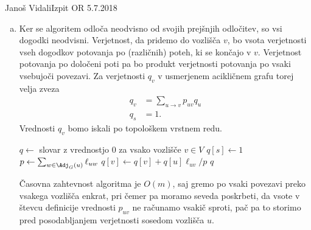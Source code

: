 \begin{naloga}{Janoš Vidali}{Izpit OR 5.7.2018}
\begin{odgovor}
\begin{enumerate}[(a)]
\item Ker se algoritem odloča neodvisno od svojih prejšnjih odločitev,
so vsi dogodki neodvisni.
Verjetnost, da pridemo do vozlišča $v$,
bo vsota verjetnosti vseh dogodkov potovanja po (različnih) poteh,
ki se končajo v $v$.
Verjetnost potovanja po določeni poti pa bo produkt verjetnosti potovanja po vsaki vsebujoči povezavi.
Za verjetnosti $q_v$ v usmerjenem acikličnem grafu torej velja zveza
\begin{align*}
q_v &= \sum_{u \rightarrow v}p_{uv} q_u \\
q_s &= 1.
\end{align*}
Vrednosti $q_v$ bomo iskali po topološkem vrstnem redu.
\begin{small}
\begin{algorithmic}
	\State $q \gets$ slovar z vrednostjo $0$ za vsako vozlišče $v \in V$
	\State $q[s] \gets 1$
        \State $p \gets \sum_{w \in \Adj_G(u)} \ell_{uw}$
			\State $q[v] \gets q[v] + q[u] \ell_{uv} / p$
		\EndFor
	\EndFor
    \State \Return $q$
\EndFunction
\end{algorithmic}
\end{small}
Časovna zahtevnost algoritma je $O(m)$, 
saj gremo po vsaki povezavi preko vsakega vozlišča enkrat, 
pri čemer pa moramo seveda poskrbeti,
da vsote v števcu definicije vrednosti $p_{uv}$ ne računamo vsakič sproti,
pač pa to storimo pred posodabljanjem verjetnosti sosedom vozlišča $u$.
\end{enumerate}
%
\begin{slika}
\end{slika}
\end{odgovor}
\end{naloga}
